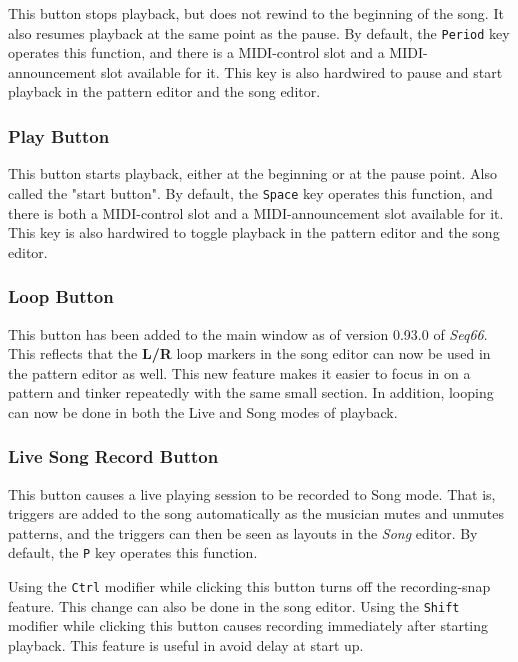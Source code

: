    This button stops playback, but does not rewind to the beginning of the
   song.  It also resumes playback at the same point as the pause.  By default,
   the \texttt{Period} key operates this function, and there is a MIDI-control
   slot and a MIDI-announcement slot available for it.  This key is also
   hardwired to pause and start playback in the pattern editor and the song
   editor.

\subsubsection{Play Button}
\label{subsubsec:introduction_play_button}

   This button starts playback, either at the beginning or at the pause point.
   Also called the "start button".
   By default, the \texttt{Space} key operates this function,
   and there is both a MIDI-control slot and a MIDI-announcement slot
   available for it.
   This key is also hardwired to toggle playback in the pattern editor and the
   song editor.

\subsubsection{Loop Button}
\label{subsubsec:introduction_loop_button}

   This button has been added to the main window as of version 0.93.0 of
   \textsl{Seq66}.
   This reflects that the \textbf{L/R} loop markers in the song editor can now
   be used in the pattern editor as well.  This new feature makes it easier to
   focus in on a pattern and tinker repeatedly with the same small section.
   In addition, looping can now be done in both the Live and Song modes of
   playback.

\subsubsection{Live Song Record Button}
\label{subsubsec:introduction_live_record_button}

   This button causes a live playing session to be recorded to Song mode.
   That is, triggers are added to the song automatically as the musician mutes
   and unmutes patterns, and the triggers can then be
   seen as layouts in the \textsl{Song} editor.
   By default, the \texttt{P} key operates this function.

   Using the \texttt{Ctrl} modifier while clicking this button
   turns off the recording-snap feature.
   This change can also be done in the song editor.
   Using the \texttt{Shift} modifier while clicking this button
   causes recording immediately after starting playback.
   This feature is useful in avoid delay at start up.

